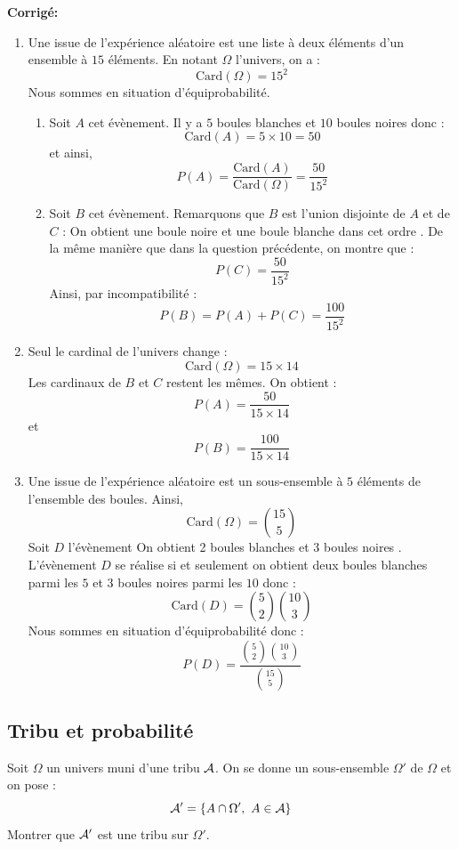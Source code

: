 \documentclass[a4paper,twoside,french,10pt]{VcCours}
\newcommand{\corr}{\textbf{Corrigé:}}
\begin{document}
\corr 

\begin{enumerate}
\item Une issue de l'expérience aléatoire est une liste à deux éléments d'un ensemble à $15$ éléments. En notant $\Omega$ l'univers, on a :
$$ \textrm{Card}(\Omega)= 15^2$$
Nous sommes en situation d'équiprobabilité.

\begin{enumerate}
\item Soit $A$ cet évènement. Il y a $5$ boules blanches et $10$ boules noires donc :
$$ \textrm{Card}(A)= 5 \times 10 = 50$$
et ainsi,
$$ P(A) = \dfrac{\textrm{Card}(A)}{\textrm{Card}(\Omega)} = \dfrac{50}{15^2}$$
\item Soit $B$ cet évènement. Remarquons que $B$ est l'union disjointe de $A$ et de $C$ : \og On obtient une boule noire et une boule blanche dans cet ordre \fg. De la même manière que dans la question précédente, on montre que :
$$ P(C) = \dfrac{50}{15^2}$$
Ainsi, par incompatibilité :
$$ P(B) = P(A)+ P(C) = \dfrac{100}{15^2}$$
\end{enumerate}
\item Seul le cardinal de l'univers change : 
$$ \textrm{Card}(\Omega)= 15 \times 14$$
Les cardinaux de $B$ et $C$ restent les mêmes. On obtient :
$$ P(A)   = \dfrac{50}{15 \times 14}$$
et 
$$ P(B)   = \dfrac{100}{15 \times 14}$$
\item Une issue de l'expérience aléatoire est un sous-ensemble à $5$ éléments de l'ensemble des boules. Ainsi,
$$ \textrm{Card}(\Omega)= \binom{15}{5} $$
Soit $D$ l'évènement \og On obtient 2 boules blanches et 3 boules noires \fg. L'évènement $D$ se réalise si et seulement on obtient deux boules blanches parmi les $5$ et $3$ boules noires parmi les $10$ donc :
$$ \textrm{Card}(D) = \binom{5}{2} \binom{10}{3}$$
Nous sommes en situation d'équiprobabilité donc :
$$ P(D) = \dfrac{\binom{5}{2} \binom{10}{3}}{\binom{15}{5}}$$
\end{enumerate}

\newpage




\subsection{Tribu et probabilité}




\begin{Exercice}{} Soit $\Omega$ un univers muni d'une tribu ${\cal A}$. On se donne un sous-ensemble $\Omega'$ de $\Omega$ et on pose :
 $${\cal A}'=\{A\cap \Omega',\ A\in{\cal A}\}$$
Montrer que ${\cal A}'$ est une tribu sur $\Omega'.$
\end{Exercice}
\end{document}
